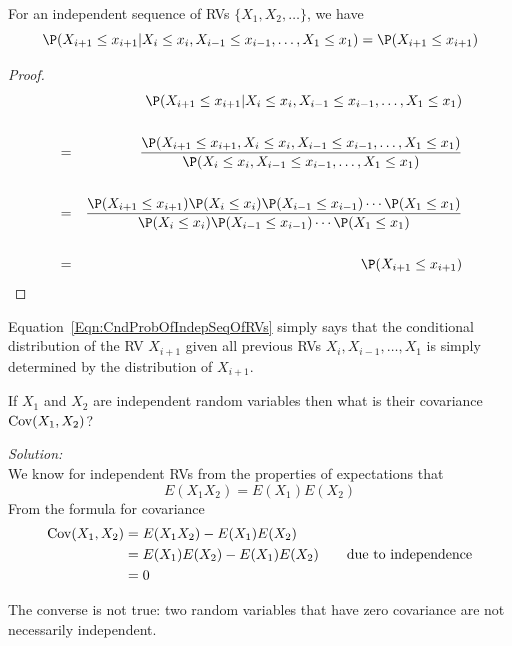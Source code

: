 \begin{prop}
For an independent sequence of RVs $\{X_1,X_2,\ldots\}$, we have
\begin{equation}\label{Eqn:CndProbOfIndepSeqOfRVs}
\P(X_{i+1} \leq x_{i+1} | X_{i} \leq x_{i}, X_{i-1} \leq x_{i-1}, \ldots, X_1 \leq x_1) =  \P(X_{i+1} \leq x_{i+1}) 
\end{equation}
\end{prop}
\begin{proof}
\begin{eqnarray}
&&\P(X_{i+1} \leq x_{i+1} | X_{i} \leq x_{i}, X_{i-1} \leq x_{i-1}, \ldots, X_1 \leq x_1) \notag\\
\notag \\
&=& \frac{\P(X_{i+1} \leq x_{i+1}, X_{i} \leq x_{i}, X_{i-1} \leq x_{i-1}, \ldots, X_1 \leq x_1)}{\P(X_{i} \leq x_{i}, X_{i-1} \leq x_{i-1}, \ldots, X_1 \leq x_1)} \notag \\
\notag \\
&=& \frac{\P(X_{i+1} \leq x_{i+1}) \P(X_{i} \leq x_{i}) \P(X_{i-1} \leq x_{i-1}) \cdots \P(X_1 \leq x_1)}{\P(X_{i} \leq x_{i}) \P(X_{i-1} \leq x_{i-1}) \cdots \P(X_1 \leq x_1)} \notag \\
\notag \\
&=& \P(X_{i+1} \leq x_{i+1}) \notag 
\end{eqnarray}
\end{proof}
Equation~\eqref{Eqn:CndProbOfIndepSeqOfRVs} simply says that the conditional distribution of the RV $X_{i+1}$ given all previous RVs $X_i,X_{i-1},\ldots,X_1$ is simply determined by the distribution of $X_{i+1}$.

\begin{example}\label{EgCovOf2IndepRVs}
If $X_1$ and $X_2$ are independent random variables then what is their covariance $\mathop{\rm Cov}(X_1,X_2)$?

{\em Solution:}\\[4pt]
We know for independent RVs from the properties of expectations that
\[
E(X_1X_2) = E(X_1)E(X_2)
\]
From the formula for covariance
\begin{align*}
\mathop{\rm Cov} (X_1,X_2) 
&= E(X_1 X_2)-E(X_1)E(X_2)\\
&= E(X_1) E(X_2)-E(X_1)E(X_2) \qquad \text{due to independence}\\
&= 0
\end{align*}
\end{example}

\begin{rem}
The converse is not true: two random variables that have zero covariance are not necessarily independent.
\end{rem}

